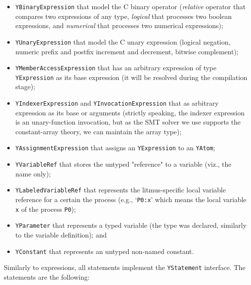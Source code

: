 \begin{itemize}%
  \item \texttt{YBinaryExpression} that model the C binary operator (\textit{relative} operator that compares two expressions of any type, \textit{logical} that processes two boolean expressions, and \textit{numerical} that processes two numerical expressions);

  \item \texttt{YUnaryExpression} that model the C unary expression (logical negation, numeric prefix and postfix increment and decrement, bitwise complement);

  \item \texttt{YMemberAccessExpression} that has an arbitrary expression of type \texttt{YExpression} as its base expression (it will be resolved during the compilation stage);%

  \item \texttt{YIndexerExpression} and \texttt{YInvocationExpression} that as arbitrary expression as its base or arguments (strictly speaking, the indexer expression is an unary-function invocation, but as the SMT solver we use supports the constant-array theory, we can maintain the array type);

  \item \texttt{YAssignmentExpression} that assigns an \texttt{YExpression} to an \texttt{YAtom};

  \item \texttt{YVariableRef} that stores the untyped "reference" to a variable (viz., the name only);

  \item \texttt{YLabeledVariableRef} that represents the litmus-specific local variable reference for a certain the process (e.g., `\lstinline{P0:x}' which means the local variable \lstinline{x} of the process \lstinline{P0});

  \item \texttt{YParameter} that represents a typed variable (the type was declared, similarly to the variable definition); and

  \item \texttt{YConstant} that represents an untyped non-named constant.
\end{itemize}

Similarly to expressions, all \ytree{} statements implement the \texttt{YStatement} interface. The statements are the following: 

